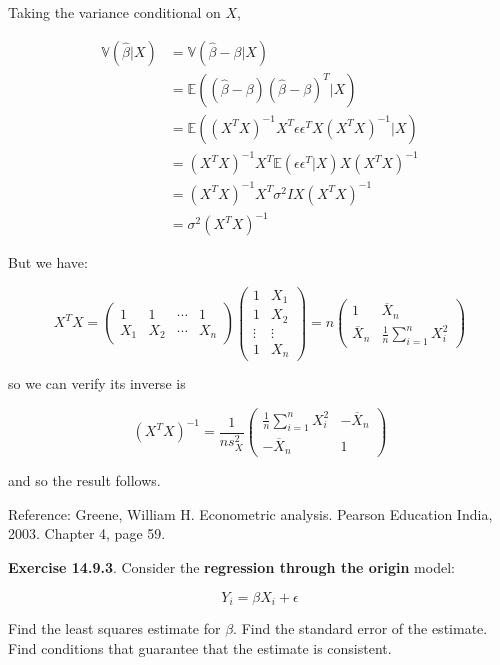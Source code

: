 Taking the variance conditional on \(X\),

\begin{align*}
\mathbb{V}(\hat{\beta} | X) &= \mathbb{V}(\hat{\beta} - \beta | X) \\
&= \mathbb{E}((\hat{\beta} - \beta)(\hat{\beta} - \beta)^T | X)  \\
&= \mathbb{E}((X^T X)^{-1}X^T \epsilon\epsilon^T X(X^T X)^{-1} | X) \\
&= (X^T X)^{-1}X^T \mathbb{E}(\epsilon\epsilon^T | X) X(X^T X)^{-1} \\
&= (X^T X)^{-1}X^T \sigma^{2} I X(X^T X)^{-1} \\
&= \sigma^{2} (X^T X)^{-1} 
\end{align*}

But we have:

\[ X^T X = \begin{pmatrix}
1 & 1 & \cdots & 1 \\
X_{1} & X_{2} & \cdots & X_{n}
\end{pmatrix} \begin{pmatrix}
1 & X_{1} \\
1 & X_{2} \\
\vdots & \vdots \\
1 & X_{n}
\end{pmatrix} = 
n \begin{pmatrix}
1 & \overline{X}_{n} \\
\overline{X}_{n} & \frac{1}{n}\sum_{i=1}^{n} X_{i}^{2}
\end{pmatrix}
\]

so we can verify its inverse is

\[(X^T X)^{-1} = \frac{1}{n s_X^{2}} \begin{pmatrix}
\frac{1}{n} \sum_{i=1}^{n} X_{i}^{2} & - \overline{X}_{n} \\
-\overline{X}_{n} & 1
\end{pmatrix}\]

and so the result follows.

Reference: Greene, William H. Econometric analysis. Pearson Education
India, 2003. Chapter 4, page 59.

\textbf{Exercise 14.9.3}. Consider the \textbf{regression through the
origin} model:

\[Y_{i} = \beta X_{i} + \epsilon\]

Find the least squares estimate for \(\beta\). Find the standard error
of the estimate. Find conditions that guarantee that the estimate is
consistent.

